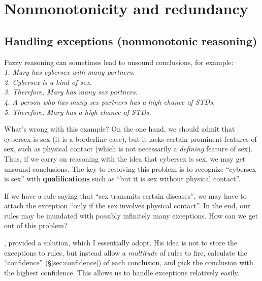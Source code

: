 \documentclass[a4paper]{report}
\begin{document}
\section{Nonmonotonicity and redundancy}

\subsection{Handling exceptions (nonmonotonic reasoning)}
\label{sec:exceptions}

Fuzzy reasoning can sometimes lead to unsound conclusions, for example:\\
\textit{1. Mary has cybersex with many partners.\\
2. Cybersex is a kind of sex.\\
3. Therefore, Mary has many sex partners.\\
4. A person who has many sex partners has a high chance of STDs.\\
5. Therefore, Mary has a high chance of STDs.}

What's wrong with this example?  On the one hand, we should admit that cybersex is sex (it is a borderline case), but it lacks certain prominent features of sex, such as physical contact (which is not necessarily a \textit{defining} feature of sex).  Thus, if we carry on reasoning with the idea that cybersex is sex, we may get unsound conclusions.  The key to resolving this problem is to recognize ``cybersex is sex'' with \textbf{qualifications} such as ``but it is sex without physical contact''.

If we have a rule saying that ``sex transmits certain diseases'', we may have to attach the exception ``only if the sex involves physical contact''.  In the end, our rules may be inundated with possibly infinitely many exceptions.  How can we get out of this problem?

\citep*{Wang1994}, \citep*{Wang2006} provided a solution, which I essentially adopt.  His idea is not to store the exceptions to rules, but instead allow a \textit{multitude} of rules to fire, calculate the ``confidence'' (\S\ref{sec:confidence}) of each conclusion, and pick the conclusion with the highest confidence.  This allows us to handle exceptions relatively easily.


\end{document}
